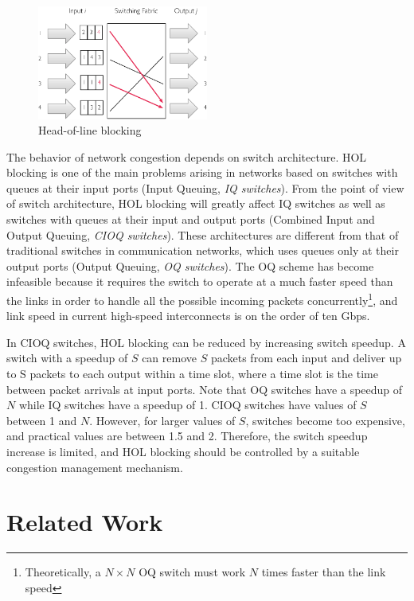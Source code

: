 \begin{figure}[ht]
	\centering
		\includegraphics[width=0.50\textwidth]{figures/hol_blocking.pdf}
		\caption{Head-of-line blocking}
		\label{fig:hol}
\end{figure}

The behavior of network congestion depends on switch architecture. HOL blocking is one of the main problems arising in networks based on switches with queues at their input ports (Input Queuing, \emph{IQ switches}). From the point of view of switch architecture, HOL blocking will greatly affect IQ switches as well as switches with queues at their input and output ports (Combined Input and Output Queuing, \emph{CIOQ switches}). These architectures are different from that of traditional switches in communication networks, which uses queues only at their output ports (Output Queuing, \emph{OQ switches}). The OQ scheme has become infeasible because it requires the switch to operate at a much faster speed than the links in order to handle all the possible incoming packets concurrently\footnote{Theoretically, a ${N \times N}$ OQ switch must work ${N}$ times faster than the link speed}, and link speed in current high-speed interconnects is on the order of ten Gbps. 

In CIOQ switches, HOL blocking can be reduced by increasing switch speedup\label{desc:switch_speedup}. A switch with a speedup of ${S}$ can remove ${S}$ packets from each input and deliver up to S packets to each output within a time slot, where a time slot is the time between packet arrivals at input ports. Note that OQ switches have a speedup of${N}$ while IQ switches have a speedup of 1. CIOQ switches have values of ${S}$ between 1 and ${N}$. However, for larger values of ${S}$, switches become too expensive, and practical values are between 1.5 and 2. Therefore, the switch speedup increase is limited, and HOL blocking should be controlled by a suitable congestion management mechanism.

\section{Related Work}\label{S:works}

